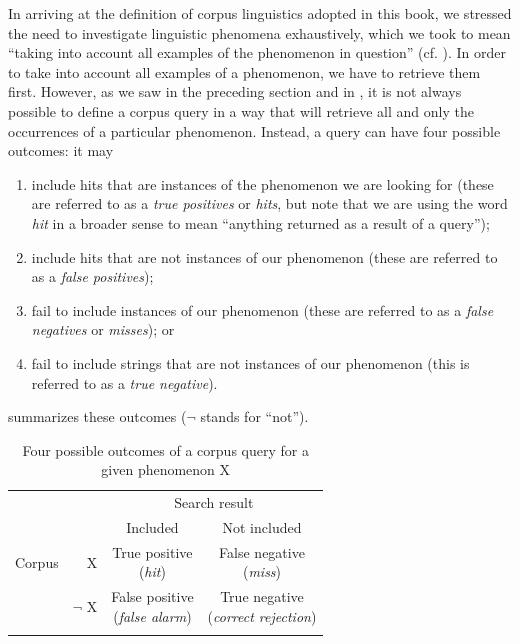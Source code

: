 In arriving at the definition of corpus linguistics adopted in this book, we stressed the need to investigate linguistic phenomena exhaustively, which we took to mean ``taking into account all examples of the phenomenon in question'' (cf. ). In order to take into account all examples of a phenomenon, we have to retrieve  them first. However, as we saw in the preceding section and in , it is not always possible to define a corpus query  in a way that will retrieve all and only the occurrences of a particular phenomenon. Instead, a query can have four possible outcomes: it may

\begin{enumerate}
\item include hits  that are instances of the phenomenon we are looking for (these are referred to as a \textit{true positives} or \textit{hits}, but note that we are using the word \textit{hit} in a broader sense to mean ``anything returned as a result of a  query'');
\item include hits  that are not instances of our phenomenon (these are referred to as a \textit{false positives});
\item fail to include instances of our phenomenon (these are referred to as a \textit{false negatives} or \textit{misses}); or
\item fail to include strings that are not instances of our phenomenon (this is referred to as a \textit{true negative}).
\end{enumerate}

\noindent {} summarizes these outcomes ($\lnot$ stands for ``not'').

\begin{table}[H]
\caption{Four possible outcomes of a corpus query for a given phenomenon X}
\label{tab:queryoutcomes}
\begin{tabular}[t]{lrcc}
\lsptoprule
 & & \multicolumn{2}{c}{Search result} \\
 & & Included & Not included \\
\midrule
Corpus & X & \makecell[t]{True positive \\ \footnotesize{(\textit{hit})}} & \makecell[t]{False negative \\ \footnotesize{(\textit{miss})}} \\
 & $\lnot$ X & \makecell[t]{False positive \\ \footnotesize{(\textit{false alarm})}} & \makecell[t]{True negative \\ \footnotesize{(\textit{correct rejection})}} \\
\lspbottomrule
\end{tabular}
\end{table}


